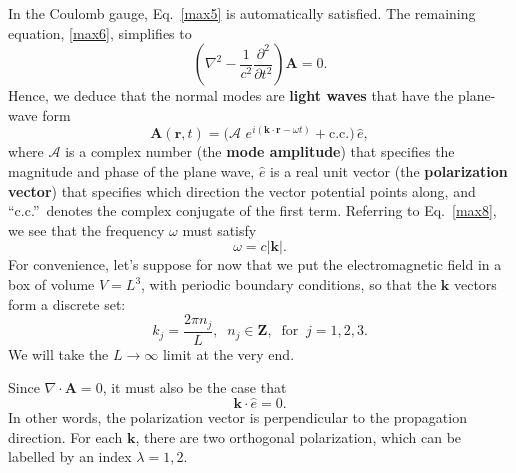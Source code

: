 \documentclass[pra,12pt]{revtex4}
\begin{document}
In the Coulomb gauge, Eq.~\eqref{max5} is automatically satisfied.
The remaining equation, \eqref{max6}, simplifies to
\begin{equation}
  \left(\nabla^2 - \frac{1}{c^2}\frac{\partial^2}{\partial t^2}\right)
  \mathbf{A} = 0. \label{max8}
\end{equation}
Hence, we deduce that the normal modes are \textbf{light waves} that
have the plane-wave form
\begin{equation}
  \mathbf{A}(\mathbf{r},t) = \Big(\mathcal{A}\,
  \, e^{i(\mathbf{k}\cdot\mathbf{r} - \omega t)} + \mathrm{c.c.}\Big)\, \hat{e},
  \label{lightplanewave}
\end{equation}
where $\mathcal{A}$ is a complex number (the \textbf{mode amplitude})
that specifies the magnitude and phase of the plane wave, $\hat{e}$ is
a real unit vector (the \textbf{polarization vector}) that specifies
which direction the vector potential points along, and
``c.c.''~denotes the complex conjugate of the first term.  Referring
to Eq.~\eqref{max8}, we see that the frequency $\omega$ must satisfy
\begin{equation}
  \omega = c|\mathbf{k}|.
\end{equation}
For convenience, let's suppose for now that we put the electromagnetic
field in a box of volume $V = L^3$, with periodic boundary conditions, so
that the $\mathbf{k}$ vectors form a discrete set:
\begin{equation}
  k_j = \frac{2\pi n_j}{L}, \;\; n_j \in \mathbf{Z}, \;\;\mathrm{for}
  \;\; j = 1,2,3.
\end{equation}
We will take the $L \rightarrow \infty$ limit at the very end.

Since $\nabla \cdot \mathbf{A} = 0$, it must also be the case that
\begin{equation}
  \mathbf{k} \cdot \hat{e} = 0.
\end{equation}
In other words, the polarization vector is perpendicular to the
propagation direction.  For each $\mathbf{k}$, there are two
orthogonal polarization, which can be labelled by an index $\lambda =
1,2$.
\end{document}

